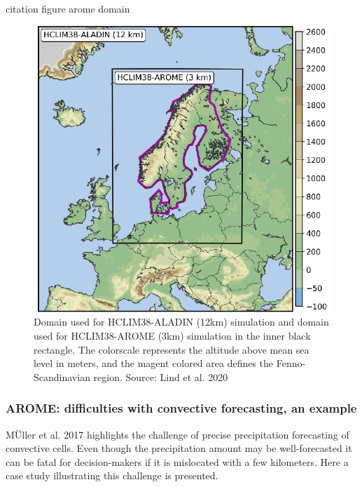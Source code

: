 \\
\cite{lind_arome} citation figure arome domain 
\begin{figure}[hbt!]
    \centering
    \includegraphics[scale=0.2]{figures/arome_domain.png}
    \caption{Domain used for HCLIM38-ALADIN (12km) simulation and domain used for HCLIM38-AROME (3km) simulation in the inner black rectangle. The colorscale represents the altitude above mean sea level in meters, and the magent colored area defines the Fenno-Scandinavian region. Source: Lind et al. 2020 \cite{lind_arome}}
    \label{fig:arome_domain}
\end{figure}

\subsubsection{AROME: difficulties with convective forecasting, an example}

MÜller et al. 2017 \cite{muller} highlights the challenge of precise precipitation forecasting of convective cells. Even though the precipitation amount may be well-forecasted it can be fatal for decision-makers if it is mislocated with a few kilometers. Here a case study illustrating this challenge is presented. 

